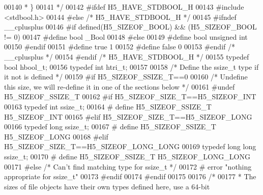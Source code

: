 \begin{DoxyCode}
00140 \textcolor{comment}{ *  \}}
00141 \textcolor{comment}{ */}
00142 \textcolor{preprocessor}{#ifdef H5\_HAVE\_STDBOOL\_H}
00143 \textcolor{preprocessor}{  #include <stdbool.h>}
00144 \textcolor{preprocessor}{#else }\textcolor{comment}{/* H5\_HAVE\_STDBOOL\_H */}\textcolor{preprocessor}{}
00145 \textcolor{preprocessor}{  #ifndef \_\_cplusplus}
00146 \textcolor{preprocessor}{    #if defined(H5\_SIZEOF\_BOOL) && (H5\_SIZEOF\_BOOL != 0)}
00147 \textcolor{preprocessor}{      #define bool    \_Bool}
00148 \textcolor{preprocessor}{    #else}
00149 \textcolor{preprocessor}{      #define bool    unsigned int}
00150 \textcolor{preprocessor}{    #endif}
00151 \textcolor{preprocessor}{    #define true    1}
00152 \textcolor{preprocessor}{    #define false   0}
00153 \textcolor{preprocessor}{  #endif }\textcolor{comment}{/* \_\_cplusplus */}\textcolor{preprocessor}{}
00154 \textcolor{preprocessor}{#endif }\textcolor{comment}{/* H5\_HAVE\_STDBOOL\_H */}\textcolor{preprocessor}{}
00155 \textcolor{keyword}{typedef} \textcolor{keywordtype}{bool} hbool\_t;
00156 \textcolor{keyword}{typedef} \textcolor{keywordtype}{int} htri\_t;
00157 
00158 \textcolor{comment}{/* Define the ssize\_t type if it not is defined */}
00159 \textcolor{preprocessor}{#if H5\_SIZEOF\_SSIZE\_T==0}
00160 \textcolor{comment}{/* Undefine this size, we will re-define it in one of the sections below */}
00161 \textcolor{preprocessor}{#undef H5\_SIZEOF\_SSIZE\_T}
00162 \textcolor{preprocessor}{#if H5\_SIZEOF\_SIZE\_T==H5\_SIZEOF\_INT}
00163 \textcolor{keyword}{typedef} \textcolor{keywordtype}{int} ssize\_t;
00164 \textcolor{preprocessor}{#       define H5\_SIZEOF\_SSIZE\_T H5\_SIZEOF\_INT}
00165 \textcolor{preprocessor}{#elif H5\_SIZEOF\_SIZE\_T==H5\_SIZEOF\_LONG}
00166 \textcolor{keyword}{typedef} \textcolor{keywordtype}{long} ssize\_t;
00167 \textcolor{preprocessor}{#       define H5\_SIZEOF\_SSIZE\_T H5\_SIZEOF\_LONG}
00168 \textcolor{preprocessor}{#elif H5\_SIZEOF\_SIZE\_T==H5\_SIZEOF\_LONG\_LONG}
00169 \textcolor{keyword}{typedef} \textcolor{keywordtype}{long} \textcolor{keywordtype}{long} ssize\_t;
00170 \textcolor{preprocessor}{#       define H5\_SIZEOF\_SSIZE\_T H5\_SIZEOF\_LONG\_LONG}
00171 \textcolor{preprocessor}{#else }\textcolor{comment}{/* Can't find matching type for ssize\_t */}\textcolor{preprocessor}{}
00172 \textcolor{preprocessor}{#   error "nothing appropriate for ssize\_t"}
00173 \textcolor{preprocessor}{#endif}
00174 \textcolor{preprocessor}{#endif}
00175 
00176 \textcolor{comment}{/*}
00177 \textcolor{comment}{ * The sizes of file objects have their own types defined here, use a 64-bit}

\end{DoxyCode}
